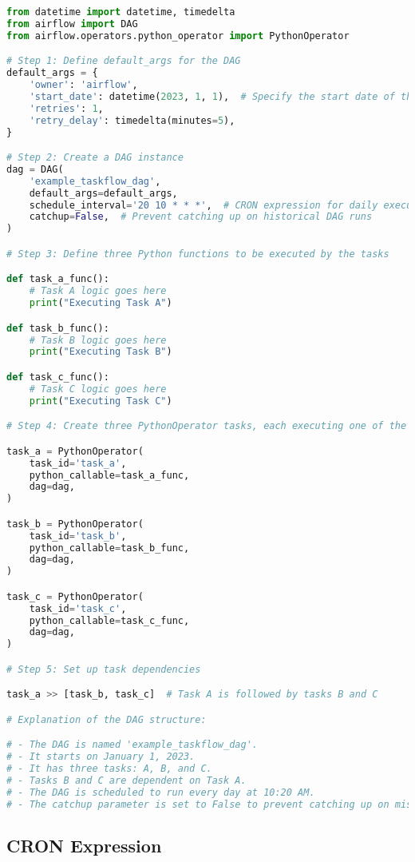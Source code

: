 \begin{lstlisting}[language=python]
from datetime import datetime, timedelta
from airflow import DAG
from airflow.operators.python_operator import PythonOperator

# Step 1: Define default_args for the DAG
default_args = {
    'owner': 'airflow',
    'start_date': datetime(2023, 1, 1),  # Specify the start date of the DAG
    'retries': 1,
    'retry_delay': timedelta(minutes=5),
}

# Step 2: Create a DAG instance
dag = DAG(
    'example_taskflow_dag',
    default_args=default_args,
    schedule_interval='20 10 * * *',  # CRON expression for daily execution at 10:20 AM
    catchup=False,  # Prevent catching up on historical DAG runs
)

# Step 3: Define three Python functions to be executed by the tasks

def task_a_func():
    # Task A logic goes here
    print("Executing Task A")

def task_b_func():
    # Task B logic goes here
    print("Executing Task B")

def task_c_func():
    # Task C logic goes here
    print("Executing Task C")

# Step 4: Create three PythonOperator tasks, each executing one of the functions

task_a = PythonOperator(
    task_id='task_a',
    python_callable=task_a_func,
    dag=dag,
)

task_b = PythonOperator(
    task_id='task_b',
    python_callable=task_b_func,
    dag=dag,
)

task_c = PythonOperator(
    task_id='task_c',
    python_callable=task_c_func,
    dag=dag,
)

# Step 5: Set up task dependencies

task_a >> [task_b, task_c]  # Task A is followed by tasks B and C

# Explanation of the DAG structure:

# - The DAG is named 'example_taskflow_dag'.
# - It starts on January 1, 2023.
# - It has three tasks: A, B, and C.
# - Tasks B and C are dependent on Task A.
# - The DAG is scheduled to run every day at 10:20 AM.
# - The catchup parameter is set to False to prevent catching up on missed DAG runs.
\end{lstlisting}

\subsection{CRON Expression}

